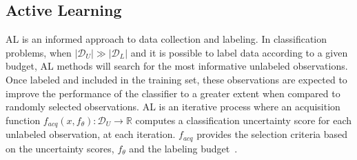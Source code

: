 % 
% 
% 
% 
% 
% 


\subsection{Active Learning}\label{sec:active-learning}

AL is an informed approach to data collection and labeling. In classification
problems, when $|\mathcal{D}_U| \gg |\mathcal{D}_L|$ and it is possible to
label data according to a given budget, AL methods will search for the most
informative unlabeled observations. Once labeled and included in the
training set, these observations are expected to improve the performance of
the classifier to a greater extent when compared to randomly selected
observations. AL is an iterative process where an acquisition function
$f_{acq}(x, f_\theta): \mathcal{D}_U \to \mathbb{R}$ computes a classification
uncertainty score for each unlabeled observation, at each iteration.
$f_{acq}$ provides the selection criteria based on the uncertainty scores,
$f_\theta$ and the labeling budget~\cite{kim2021lada}.

